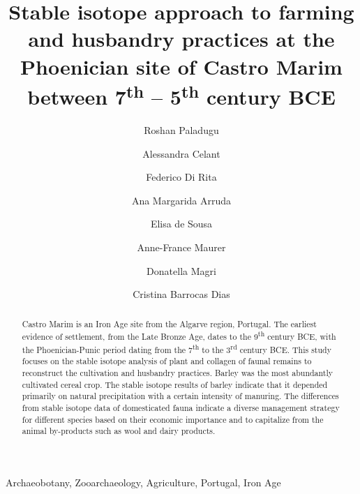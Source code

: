\documentclass[3p]{elsarticle} %
\begin{document}
\begin{frontmatter}

  \title{Stable isotope approach to farming and husbandry practices at the Phoenician site of Castro Marim between 7\textsuperscript{th} -- 5\textsuperscript{th} century BCE}
    \author[Universidade de Évora,Laboratório HERCULES,Sapienza Università di Roma]{Roshan Paladugu}
    \author[Sapienza Università di Roma]{Alessandra Celant}
    \author[Sapienza Università di Roma]{Federico Di Rita}
    \author[Universidade de Lisboa]{Ana Margarida Arruda}
    \author[Universidade de Lisboa]{Elisa de Sousa}
    \author[Universidade de Évora,Laboratório HERCULES]{Anne-France Maurer}
    \author[Sapienza Università di Roma]{Donatella Magri}
    \author[Universidade de Évora,Laboratório HERCULES]{Cristina Barrocas Dias}
      \address[Universidade de Évora]{Departamento de Química, Escola de Ciências e Tecnologia, Universidade de Évora, Colégio Luís António Verney, Rua Romão Ramalho 59, Évora, Portugal (7000-671)}
    \address[Laboratório HERCULES]{Laboratório HERCULES, Universidade de Évora, Palácio do Vimioso, Largo Marquês de Marialva 8, 7000-554 Évora, Portugal}
    \address[Sapienza Università di Roma]{Dipartimento di Biologia Ambientale, Sapienza Università di Roma, Piazzale A. Moro 5, 00185 Roma, Italy}
    \address[Universidade de Lisboa]{Centro de Arqueologia da Universidade de Lisboa, Faculdade de Letras da Universidade de Lisboa, Alameda da Universidade, 1600-214, Lisboa, Portugal}
  
  \begin{abstract}
  Castro Marim is an Iron Age site from the Algarve region, Portugal. The earliest evidence of settlement, from the Late Bronze Age, dates to the 9\textsuperscript{th} century BCE, with the Phoenician-Punic period dating from the 7\textsuperscript{th} to the 3\textsuperscript{rd} century BCE. This study focuses on the stable isotope analysis of plant and collagen of faunal remains to reconstruct the cultivation and husbandry practices. Barley was the most abundantly cultivated cereal crop. The stable isotope results of barley indicate that it depended primarily on natural precipitation with a certain intensity of manuring. The differences from stable isotope data of domesticated fauna indicate a diverse management strategy for different species based on their economic importance and to capitalize from the animal by-products such as wool and dairy products.
  \end{abstract}
   \begin{keyword} Archaeobotany, Zooarchaeology, Agriculture, Portugal, Iron Age\end{keyword}
 \end{frontmatter}
\end{document}
